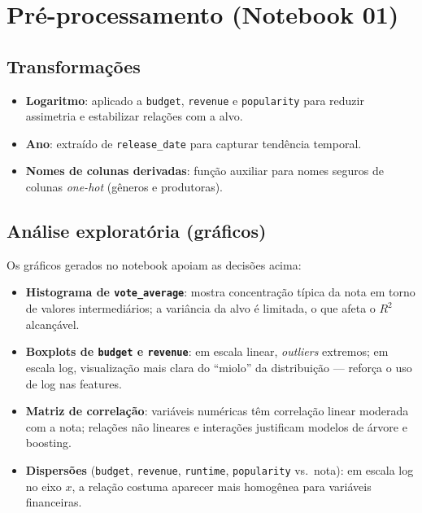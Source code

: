\documentclass[11pt,a4paper]{article}
\begin{document}
\section{Pré-processamento (Notebook 01)}

\subsection{Transformações}
\begin{itemize}
  \item \textbf{Logaritmo}: aplicado a \texttt{budget}, \texttt{revenue} e \texttt{popularity} para reduzir assimetria e estabilizar relações com a alvo.
  \item \textbf{Ano}: extraído de \texttt{release\_date} para capturar tendência temporal.
  \item \textbf{Nomes de colunas derivadas}: função auxiliar para nomes seguros de colunas \emph{one-hot} (gêneros e produtoras).
\end{itemize}

\subsection{Análise exploratória (gráficos)}
Os gráficos gerados no notebook apoiam as decisões acima:
\begin{itemize}
  \item \textbf{Histograma de \texttt{vote\_average}}: mostra concentração típica da nota em torno de valores intermediários; a variância da alvo é limitada, o que afeta o $R^2$ alcançável.
  \item \textbf{Boxplots de \texttt{budget} e \texttt{revenue}}: em escala linear, \emph{outliers} extremos; em escala log, visualização mais clara do ``miolo'' da distribuição --- reforça o uso de log nas features.
  \item \textbf{Matriz de correlação}: variáveis numéricas têm correlação linear moderada com a nota; relações não lineares e interações justificam modelos de árvore e boosting.
  \item \textbf{Dispersões} (\texttt{budget}, \texttt{revenue}, \texttt{runtime}, \texttt{popularity} vs.\ nota): em escala log no eixo $x$, a relação costuma aparecer mais homogênea para variáveis financeiras.
\end{itemize}
\end{document}
